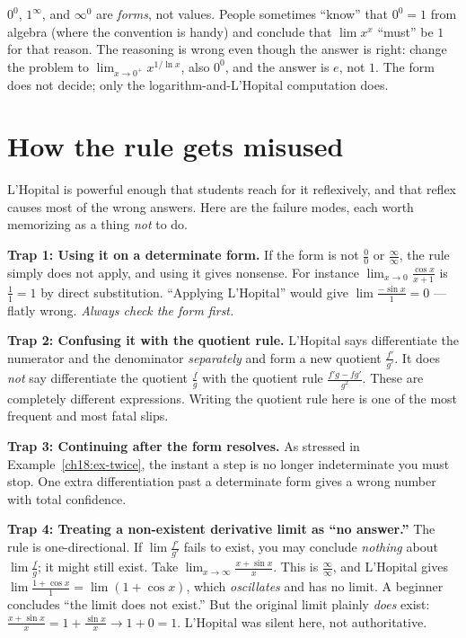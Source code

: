 \begin{trapbox}
$0^0$, $1^\infty$, and $\infty^0$ are \emph{forms}, not values. People sometimes
``know'' that $0^0=1$ from algebra (where the convention is handy) and conclude that
$\lim x^x$ ``must'' be $1$ for that reason. The reasoning is wrong even though the
answer is right: change the problem to $\lim_{x\to 0^+}x^{1/\ln x}$, also $0^0$, and
the answer is $e$, not $1$. The form does not decide; only the
logarithm-and-L'Hopital computation does.
\end{trapbox}

\section{How the rule gets misused}

L'Hopital is powerful enough that students reach for it reflexively, and that reflex
causes most of the wrong answers. Here are the failure modes, each worth memorizing as
a thing \emph{not} to do.

\begin{trapbox}
\textbf{Trap 1: Using it on a determinate form.} If the form is not $\tfrac00$ or
$\tfrac{\infty}{\infty}$, the rule simply does not apply, and using it gives nonsense.
For instance $\displaystyle\lim_{x\to 0}\frac{\cos x}{x+1}$ is $\tfrac{1}{1}=1$ by
direct substitution. ``Applying L'Hopital'' would give
$\lim \tfrac{-\sin x}{1}=0$ --- flatly wrong. \emph{Always check the form first.}
\end{trapbox}

\begin{trapbox}
\textbf{Trap 2: Confusing it with the quotient rule.} L'Hopital says differentiate the
numerator and the denominator \emph{separately} and form a new quotient
$\tfrac{f'}{g'}$. It does \emph{not} say differentiate the quotient $\tfrac{f}{g}$ with
the quotient rule $\tfrac{f'g-fg'}{g^2}$. These are completely different expressions.
Writing the quotient rule here is one of the most frequent and most fatal slips.
\end{trapbox}

\begin{trapbox}
\textbf{Trap 3: Continuing after the form resolves.} As stressed in
Example~\ref{ch18:ex-twice}, the instant a step is no longer indeterminate you must
stop. One extra differentiation past a determinate form gives a wrong number with
total confidence.
\end{trapbox}

\begin{trapbox}
\textbf{Trap 4: Treating a non-existent derivative limit as ``no answer.''} The rule is
one-directional. If $\lim\tfrac{f'}{g'}$ fails to exist, you may conclude
\emph{nothing} about $\lim\tfrac{f}{g}$; it might still exist. Take
$\displaystyle\lim_{x\to\infty}\frac{x+\sin x}{x}$. This is $\tfrac{\infty}{\infty}$,
and L'Hopital gives $\lim \tfrac{1+\cos x}{1}=\lim(1+\cos x)$, which \emph{oscillates}
and has no limit. A beginner concludes ``the limit does not exist.'' But the original
limit plainly \emph{does} exist: $\frac{x+\sin x}{x}=1+\frac{\sin x}{x}\to 1+0=1$.
L'Hopital was silent here, not authoritative.
\end{trapbox}

